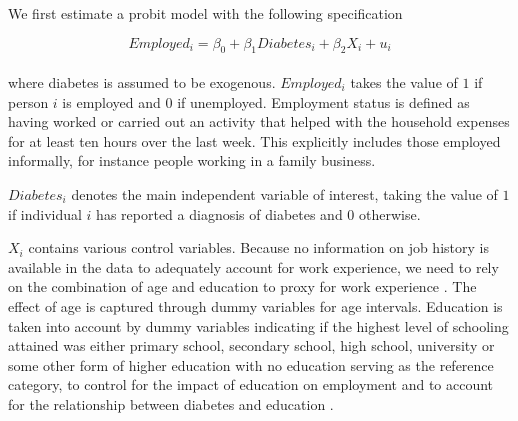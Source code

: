 We first estimate a probit model with the following specification 


\begin{equation}
Employed_{i}=\beta_{0}+\beta_{1}Diabetes_{i}+\beta_{2}X_{i}+u_{i}\label{eq:cha3_employed-2}
\end{equation}\\
where diabetes is assumed to be exogenous. $Employed_{i}$
takes the value of $1$ if person $i$ is employed and $0$ if unemployed.
Employment status is defined as having worked or carried out an activity
that helped with the household expenses for at least ten hours over
the last week. This explicitly includes those employed informally,
for instance people working in a family business. 

$Diabetes_{i}$ denotes the main independent variable of interest, taking the value
of $1$ if individual $i$ has reported a diagnosis of diabetes and
$0$ otherwise. 

$X_{i}$ contains various control variables. Because
no information on job history is available in the data to adequately
account for work experience, we need to rely on the combination of
age and education to proxy for work experience \parencite{Aaronson2010}.
The effect of age is captured through dummy variables for age intervals.
Education is taken into account by dummy variables indicating if the
highest level of schooling attained was either primary school, secondary
school, high school, university or some other form of higher education
with no education serving as the reference category, to control for
the impact of education on employment and to account for the relationship
between diabetes and education \parencite{Agardh2011}. 

